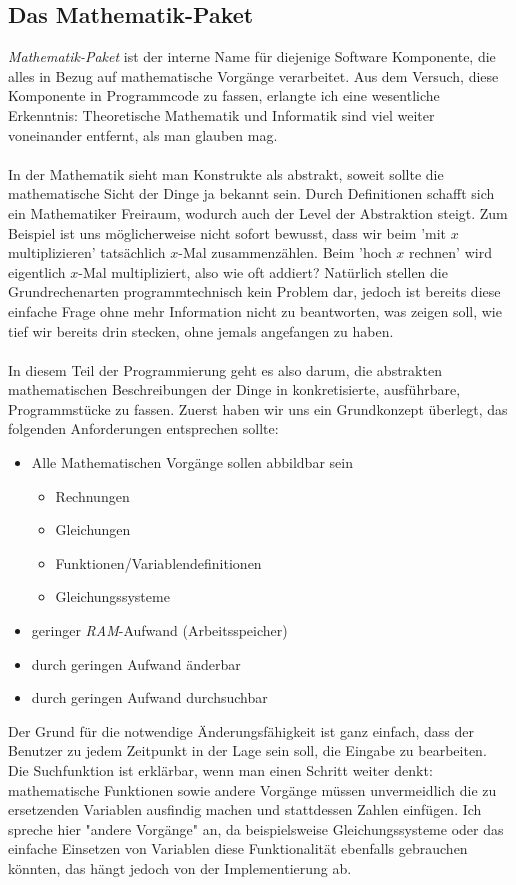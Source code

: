 \subsection{Das Mathematik-Paket}
\textit{Mathematik-Paket} ist der interne Name für diejenige Software Komponente, die alles in Bezug auf mathematische Vorgänge verarbeitet. Aus dem Versuch, diese Komponente in Programmcode zu fassen, erlangte ich eine wesentliche Erkenntnis: Theoretische Mathematik und Informatik sind viel weiter voneinander entfernt, als man glauben mag.\\\\
In der Mathematik sieht man Konstrukte als abstrakt, soweit sollte die mathematische Sicht der Dinge ja bekannt sein. Durch Definitionen schafft sich ein Mathematiker Freiraum, wodurch auch der Level der Abstraktion steigt. Zum Beispiel ist uns möglicherweise nicht sofort bewusst, dass wir beim 'mit $x$ multiplizieren' tatsächlich $x$-Mal zusammenzählen. Beim 'hoch $x$ rechnen' wird eigentlich $x$-Mal multipliziert, also wie oft addiert? Natürlich stellen die Grundrechenarten programmtechnisch kein Problem dar, jedoch ist bereits diese einfache Frage ohne mehr Information nicht zu beantworten, was zeigen soll, wie tief wir bereits drin stecken, ohne jemals angefangen zu haben.\\\\
In diesem Teil der Programmierung geht es also darum, die abstrakten mathematischen Beschreibungen der Dinge in konkretisierte, ausführbare, Programmstücke zu fassen. Zuerst haben wir uns ein Grundkonzept überlegt, das folgenden Anforderungen entsprechen sollte:
\begin{itemize}
	\item Alle Mathematischen Vorgänge sollen abbildbar sein
	\begin{itemize}
		\item Rechnungen
		\item Gleichungen
		\item Funktionen/Variablendefinitionen
		\item Gleichungssysteme
	\end{itemize}
	\item geringer \textit{RAM}-Aufwand (Arbeitsspeicher)
	\item durch geringen Aufwand änderbar
	\item durch geringen Aufwand durchsuchbar
\end{itemize}
Der Grund für die notwendige Änderungsfähigkeit ist ganz einfach, dass der Benutzer zu jedem Zeitpunkt in der Lage sein soll, die Eingabe zu bearbeiten. Die Suchfunktion ist erklärbar, wenn man einen Schritt weiter denkt: mathematische Funktionen sowie andere Vorgänge müssen unvermeidlich die zu ersetzenden Variablen ausfindig machen und stattdessen Zahlen einfügen. Ich spreche hier "andere Vorgänge" an, da beispielsweise Gleichungssysteme oder das einfache Einsetzen von Variablen diese Funktionalität ebenfalls gebrauchen könnten, das hängt jedoch von der Implementierung ab.\\

